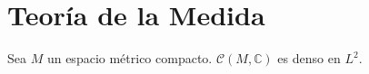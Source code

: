 \section{Teoría de la Medida}

\begin{teorema}
	Sea $M$ un espacio métrico compacto. $\mathcal{C}(M,\mathbb{C})$ es denso en $L^2$.
\end{teorema}